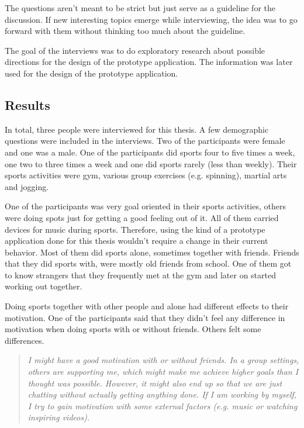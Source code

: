 The questions aren't meant to be strict but just serve as a guideline for the discussion. If new interesting topics emerge while interviewing, the idea was to go forward with them without thinking too much about the guideline.

The goal of the interviews was to do exploratory research about possible directions for the design of the prototype application. The information was later used for the design of the prototype application.

\subsection{Results}

In total, three people were interviewed for this thesis. A few demographic questions were included in the interviews. Two of the participants were female and one was  a male. One of the participants did sports four to five times a week, one two to three times a week and one did sports rarely (less than weekly). Their sports activities were gym, various group exercises (e.g. spinning), martial arts and jogging.

One of the participants was very goal oriented in their sports activities, others were doing spots just for getting a good feeling out of it. All of them carried devices for music during sports. Therefore, using the kind of a prototype application done for this thesis wouldn't require a change in their current behavior. Most of them did sports alone, sometimes together with friends. Friends that they did sports with, were mostly old friends from school. One of them got to know strangers that they frequently met at the gym and later on started working out together.

Doing sports together with other people and alone had different effects to their motivation. One of the participants said that they didn't feel any difference in motivation when doing sports with or without friends. Others felt some differences.

\begin{quotation}
\it I might have a good motivation with or without friends. In a group settings, others are supporting me, which might make me achieve higher goals than I thought was possible. However, it might also end up so that we are just chatting without actually getting anything done. If I am working by myself, I try to gain motivation with some external factors (e.g. music or watching inspiring videos).
\end{quotation}

